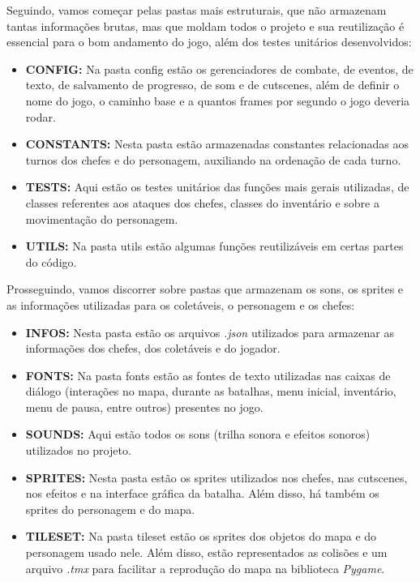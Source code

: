 \documentclass[a4paper, 12pt, twoside]{article}
\begin{document}
Seguindo, vamos começar pelas pastas mais estruturais, que não armazenam tantas informações brutas, mas que moldam todos o projeto e sua reutilização é essencial para o bom andamento do jogo, além dos testes unitários desenvolvidos:

\begin{itemize}[nosep]
    \item \textbf{CONFIG:} Na pasta config estão os gerenciadores de combate, de eventos, de texto, de salvamento de progresso, de som e de cutscenes, além de definir o nome do jogo, o caminho base e a quantos frames por segundo o jogo deveria rodar.
    \item \textbf{CONSTANTS:} Nesta pasta estão armazenadas constantes relacionadas aos turnos dos chefes e do personagem, auxiliando na ordenação de cada turno.
    \item \textbf{TESTS:} Aqui estão os testes unitários das funções mais gerais utilizadas, de classes referentes aos ataques dos chefes, classes do inventário e sobre a movimentação do personagem.
    \item \textbf{UTILS:} Na pasta utils estão algumas funções reutilizáveis em certas partes do código.
\end{itemize}

Prosseguindo, vamos discorrer sobre pastas que armazenam os sons, os sprites e as informações utilizadas para os coletáveis, o personagem e os chefes:

\begin{itemize}[nosep]
    \item \textbf{INFOS:} Nesta pasta estão os arquivos \textit{.json} utilizados para armazenar as informações dos chefes, dos coletáveis e do jogador.
    \item \textbf{FONTS:} Na pasta fonts estão as fontes de texto utilizadas nas caixas de diálogo (interações no mapa, durante as batalhas, menu inicial, inventário, menu de pausa, entre outros) presentes no jogo.
    \item \textbf{SOUNDS:} Aqui estão todos os sons (trilha sonora e efeitos sonoros) utilizados no projeto.
    \item \textbf{SPRITES:} Nesta pasta estão os sprites utilizados nos chefes, nas cutscenes, nos efeitos e na interface gráfica da batalha. Além disso, há também os sprites do personagem e do mapa.
    \item \textbf{TILESET:} Na pasta tileset estão os sprites dos objetos do mapa e do personagem usado nele. Além disso, estão representados as colisões e um arquivo \textit{.tmx} para facilitar a reprodução do mapa na biblioteca \textit{Pygame}.
\end{itemize}
\end{document}
